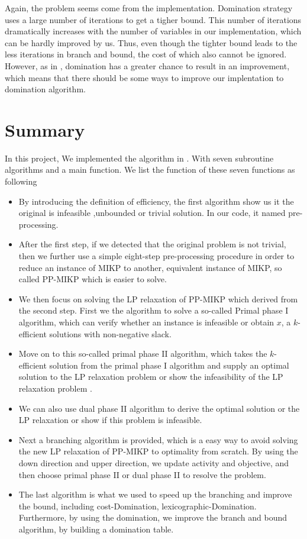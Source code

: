 \documentclass[a4paper,11pt]{article}
\begin{document}
Again, the problem seems come from the implementation. Domination strategy uses a large number of iterations to get a tigher bound. This number of iterations dramatically increases with the number of variables in our implementation, which can be hardly improved by us. Thus, even though the tighter bound leads to the less iterations in branch and bound, the cost of which also cannot be ignored. However, as in \cite{fukasawa2011exact}, domination has a greater chance to result in an improvement, which means that there should be some ways to improve our implentation to domination algorithm.



\section{Summary}
In this project, We implemented the algorithm in \cite{fukasawa2011exact}. With seven subroutine algorithms and a main function. We list the function of these seven functions as following
\begin{itemize}
\item By introducing the definition of efficiency, the first algorithm show us it the original is infeasible ,unbounded or trivial solution. In our code, it named pre-processing.
\item After the first step, if we detected that the original problem is not trivial, then we further use a simple eight-step pre-processing procedure in order to reduce an instance of MIKP to another, equivalent
instance of MIKP, so called PP-MIKP which is easier to solve.
\item We then focus on solving the LP relaxation of PP-MIKP which derived from the second step. First we the algorithm to solve a so-called Primal phase I algorithm, which can verify whether an instance is infeasible or obtain $x$, a $k$-efficient solutions with non-negative slack.
\item Move on to this so-called primal phase II algorithm, which takes the $k$-efficient solution from the primal phase I algorithm and supply an optimal solution to the LP relaxation problem or show the infeasibility of the LP relaxation problem .
\item We can also use dual phase II algorithm to derive the optimal solution or the LP relaxation or show if this problem is infeasible.
\item Next a branching algorithm is provided, which is a easy way to avoid solving the new LP relaxation of PP-MIKP to optimality from scratch. By using the down direction and upper direction, we update activity and objective, and then choose primal phase II or dual phase II to resolve the problem.
\item The last algorithm is what we used to speed up the branching and improve the bound, including cost-Domination, lexicographic-Domination. Furthermore, by using the domination, we improve the branch and bound algorithm, by building a domination table. 
\end{itemize}
\end{document}
